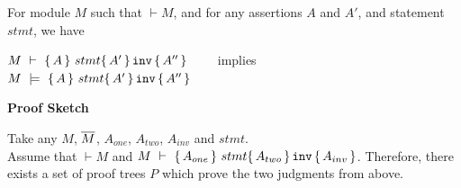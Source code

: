 \begin{theorem}
For module  $M$ %
such that  $\vdash M$, and for any assertions $A$ and $A'$, and statement  $stmt$, we have

\begin{center}
$M\ \vdash\   \{\, A \, \}\ stmt \{\, A' \, \} \, {\texttt{inv}}\, \{\, A'' \, \} $ \ \ \ \ implies \ \ \ \ $M\ \models\  \quadruple {A} {stmt} {A'} {A''}$
\end{center}

\end{theorem}

\noindent
\vspace{.2cm}
  {\textbf{Proof Sketch}} 

Take any $M$, $\overline{M}$, $A_{one}$, $A_{two}$, $A_{inv}$ and $stmt$.\\ Assume that $\vdash M$  and 
$M\ \vdash\   \{\, A_{one} \, \}\ stmt \{\, A_{two} \, \} \, {\texttt{inv}}\, \{\, A_{inv} \, \} $.
Therefore, there exists a set of
proof trees $P$ which prove  the two judgments from above.
 
